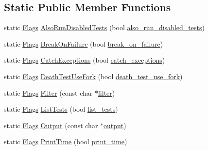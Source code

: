 \subsection*{Static Public Member Functions}
\begin{DoxyCompactItemize}
\item 
static \mbox{\hyperlink{structtesting_1_1_flags}{Flags}} \mbox{\hyperlink{structtesting_1_1_flags_a8bee2b5f94d8248b6791d6b005db146f}{Also\+Run\+Disabled\+Tests}} (bool \mbox{\hyperlink{structtesting_1_1_flags_a8ebf8c68f918b9039926b569c880f910}{also\+\_\+run\+\_\+disabled\+\_\+tests}})
\item 
static \mbox{\hyperlink{structtesting_1_1_flags}{Flags}} \mbox{\hyperlink{structtesting_1_1_flags_a62660e44922321f7640bc951a04c2296}{Break\+On\+Failure}} (bool \mbox{\hyperlink{structtesting_1_1_flags_acccce2a9673bb61751269d2ef9c21c89}{break\+\_\+on\+\_\+failure}})
\item 
static \mbox{\hyperlink{structtesting_1_1_flags}{Flags}} \mbox{\hyperlink{structtesting_1_1_flags_a2c7d89f62f4328ae0ced66154ef96b44}{Catch\+Exceptions}} (bool \mbox{\hyperlink{structtesting_1_1_flags_a06984d0553f09716e1bd9f159e7cc644}{catch\+\_\+exceptions}})
\item 
static \mbox{\hyperlink{structtesting_1_1_flags}{Flags}} \mbox{\hyperlink{structtesting_1_1_flags_a4468e5625833043596c44be174349d8c}{Death\+Test\+Use\+Fork}} (bool \mbox{\hyperlink{structtesting_1_1_flags_a7cdef4e6e102771fc15940931dd07e5c}{death\+\_\+test\+\_\+use\+\_\+fork}})
\item 
static \mbox{\hyperlink{structtesting_1_1_flags}{Flags}} \mbox{\hyperlink{structtesting_1_1_flags_afc7350b7c1ac4c0e0efe2d9a94729eb7}{Filter}} (const char $\ast$\mbox{\hyperlink{structtesting_1_1_flags_ae9ab05193291ed87627adaceef9d1279}{filter}})
\item 
static \mbox{\hyperlink{structtesting_1_1_flags}{Flags}} \mbox{\hyperlink{structtesting_1_1_flags_a825a5d763a31fe6c28f543990bd336df}{List\+Tests}} (bool \mbox{\hyperlink{structtesting_1_1_flags_a3c73f29131074146224018066379fb2f}{list\+\_\+tests}})
\item 
static \mbox{\hyperlink{structtesting_1_1_flags}{Flags}} \mbox{\hyperlink{structtesting_1_1_flags_a507916734a6d7ff2dd02891d7849f2d3}{Output}} (const char $\ast$\mbox{\hyperlink{structtesting_1_1_flags_ab8f863c8ba22841c9b1b48af7f01dfa7}{output}})
\item 
static \mbox{\hyperlink{structtesting_1_1_flags}{Flags}} \mbox{\hyperlink{structtesting_1_1_flags_af4dc8454995fb3691399a049e95de179}{Print\+Time}} (bool \mbox{\hyperlink{structtesting_1_1_flags_a8758d574ce5513402679df258f788733}{print\+\_\+time}})

\end{DoxyCompactItemize}
